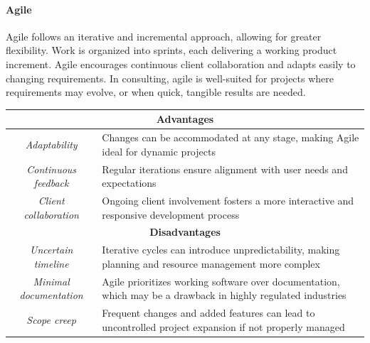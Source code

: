 \paragraph*{Agile}
Agile follows an iterative and incremental approach, allowing for greater flexibility. 
Work is organized into sprints, each delivering a working product increment. 
Agile encourages continuous client collaboration and adapts easily to changing requirements.
In consulting, agile is well-suited for projects where requirements may evolve, or when quick, tangible results are needed.
\renewcommand*{\arraystretch}{1.5}
\begin{table}[!ht]
    \centering
    \begin{tabular}{|c|p{10cm}|}
    \hline
    \multicolumn{2}{|c|}{\textbf{Advantages}} \\ \hline
    \textit{Adaptability}                    & Changes can be accommodated at any stage, making Agile ideal for dynamic projects  \\ \hline
    \textit{Continuous feedback}             & Regular iterations ensure alignment with user needs and expectations \\ \hline
    \textit{Client collaboration}            & Ongoing client involvement fosters a more interactive and responsive development process\\ \hline
    \multicolumn{2}{|c|}{\textbf{Disadvantages}} \\ \hline
    \textit{Uncertain timeline}              &  Iterative cycles can introduce unpredictability, making planning and resource management more complex \\ \hline
    \textit{Minimal documentation}           & Agile prioritizes working software over documentation, which may be a drawback in highly regulated industries\\ \hline
    \textit{Scope creep}                     & Frequent changes and added features can lead to uncontrolled project expansion if not properly managed\\ \hline
\end{tabular}
\end{table}
\renewcommand*{\arraystretch}{1}